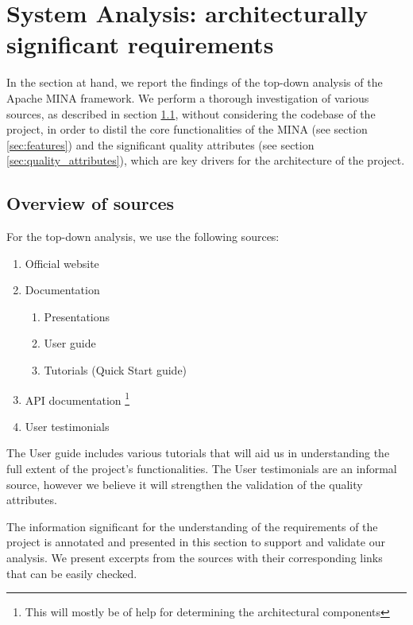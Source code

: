 \section{System Analysis: architecturally significant requirements}
\label{sec:analysis_requirements}

In the section at hand, we report the findings of the top-down analysis of the Apache MINA framework. We perform a thorough investigation of various sources, as described in section \ref{sec:overview_of_sources}, without considering the codebase of the project, in order to distil the core functionalities of the MINA (see section \ref{sec:features}) and the significant quality attributes (see section \ref{sec:quality_attributes}), which are key drivers for the architecture of the project.

\subsection{Overview of sources}
\label{sec:overview_of_sources}
For the top-down analysis, we use the following sources:
\begin{enumerate}
    \item Official website \cite{mina-website}
    \item Documentation \cite{mina-docs}
    \begin{enumerate}
        \item Presentations \cite{mina-talk2006, mina-talk2008}
        \item User guide \cite{mina-userguide}
        \item Tutorials (Quick Start guide) \cite{mina-qsguide}
    \end{enumerate}
    \item API documentation \cite{mina-reference} \footnote{This will mostly be of help for determining the architectural components}
    \item User testimonials \cite{mina-testimonials}
\end{enumerate}
The User guide includes various tutorials that will aid us in understanding the full extent of the project's functionalities. The User testimonials are an informal source, however we believe it will strengthen the validation of the quality attributes.

The information significant for the understanding of the requirements of the project is annotated and presented in this section to support and validate our analysis. We present excerpts from the sources with their corresponding links that can be easily checked.

